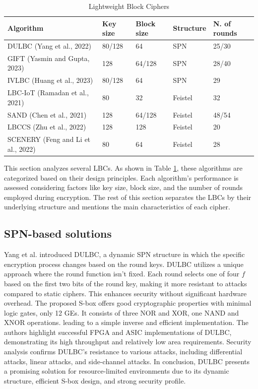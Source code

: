 \documentclass[conference]{IEEEtran}
\begin{document}
\begin{table}[ht]
    \centering
    \caption{Lightweight Block Ciphers}
    \begin{tabular}{lllll} 
     \toprule
     Algorithm & Key size & Block size & Structure & N. of rounds \\ 
     \midrule
     DULBC (Yang et al., 2022) \cite{DULBC} & 80/128 & 64 & SPN & 25/30 \\
     GIFT (Yasmin and Gupta, 2023)\cite{GIFT}\cite{yasmin2023modified} & 128 & 64/128 & SPN & 28/40 \\
     IVLBC (Huang et al., 2023)\cite{IVLBC} & 80/128 & 64 & SPN & 29 \\
     LBC-IoT (Ramadan et al., 2021)\cite{LBC-IoT} & 80 & 32 & Feistel & 32 \\
     SAND (Chen et al., 2021)\cite{SAND} & 128 & 64/128 & Feistel & 48/54 \\
     LBCCS (Zhu et al., 2022)\cite{LBCCS} & 128 & 128 & Feistel & 20 \\
     SCENERY (Feng and Li et al., 2022)\cite{SCENERY} & 80 & 64 & Feistel & 28  \\
     \bottomrule
    \end{tabular}
    \label{table:ciphers}
\end{table}

This section analyzes several LBCs. As shown in Table \ref{table:ciphers}, these algorithms are categorized based on their design principles. Each algorithm's performance is assessed considering factors like key size, block size, and the number of rounds employed during encryption. The rest of this section separates the LBCs by their underlying structure and mentions the main characteristics of each cipher.

\subsection{SPN-based solutions}

Yang et al. introduced DULBC, a dynamic SPN structure in which the specific encryption process changes based on the round keys. DULBC utilizes a unique approach where the round function isn't fixed. Each round selects one of four $f$ based on the first two bits of the round key, making it more resistant to attacks compared to static ciphers. This enhances security without significant hardware overhead. The proposed S-box offers good cryptographic properties with minimal logic gates, only 12 GEs. It consists of three NOR and XOR, one NAND and XNOR operations. leading to a simple inverse and efficient implementation. The authors highlight successful FPGA and ASIC implementations of DULBC, demonstrating its high throughput and relatively low area requirements. Security analysis confirms DULBC's resistance to various attacks, including differential attacks, linear attacks, and side-channel attacks. In conclusion, DULBC presents a promising solution for resource-limited environments due to its dynamic structure, efficient S-box design, and strong security profile.\cite{DULBC}
\end{document}
